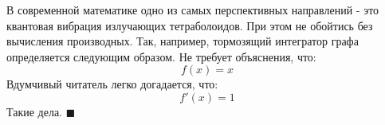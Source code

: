 \documentclass{article}
\begin{document}
 

В современной математике одно из самых перспективных направлений - это квантовая вибрация излучающих тетраболоидов. При этом не обойтись без вычисления производных. Так, например, тормозящий интегратор графа определяется следующим образом.
Не требует объяснения, что:
\begin{equation*}
f(x) = x
\end{equation*}
Вдумчивый читатель легко догадается, что:
\begin{equation*}
f'(x) = 1
\end{equation*}
Такие дела. $\blacksquare$
\end{document}

